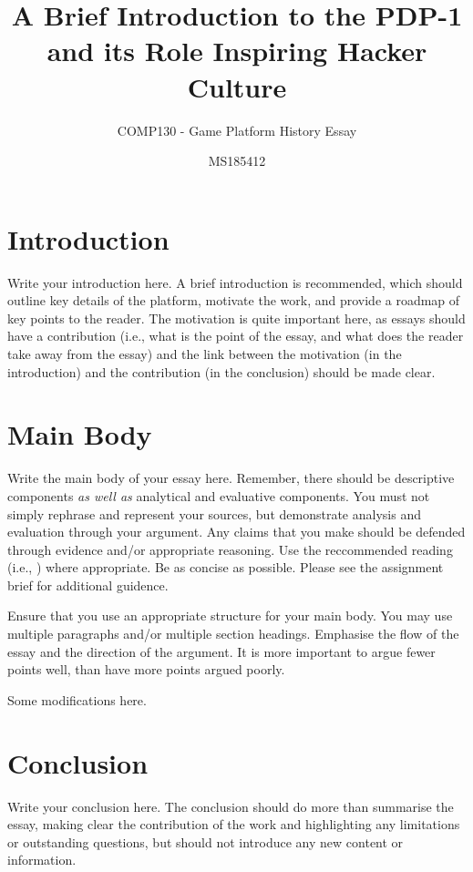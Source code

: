\documentclass{scrartcl}
\title{A Brief Introduction to the PDP-1 and its Role Inspiring Hacker Culture}
\subtitle{COMP130 - Game Platform History Essay}
\author{MS185412}
\begin{document}
\maketitle


\section{Introduction}

Write your introduction here. A brief introduction is recommended, which should outline key details of the platform, motivate the work, and provide a roadmap of key points to the reader. The motivation is quite important here, as essays should have a contribution (i.e., what is the point of the essay, and what does the reader take away from the essay) and the link between the motivation (in the introduction) and the contribution (in the conclusion) should be made clear.

\section{Main Body}

Write the main body of your essay here. Remember, there should be descriptive components \textit{as well as} analytical and evaluative components. You must not simply rephrase and represent your sources, but demonstrate analysis and evaluation through your argument. Any claims that you make should be defended through evidence and/or appropriate reasoning. Use the reccommended reading (i.e., \cite{evans2006invisible}) where appropriate. Be as concise as possible. Please see the assignment brief for additional guidence. 

Ensure that you use an appropriate structure for your main body. You may use multiple paragraphs and/or multiple section headings. Emphasise the flow of the essay and the direction of the argument. It is more important to argue fewer points well, than have more points argued poorly.

Some modifications here.

\section{Conclusion}

Write your conclusion here. The conclusion should do more than summarise the essay, making clear the contribution of the work and highlighting any limitations or outstanding questions, but should not introduce any new content or information.



\end{document}
